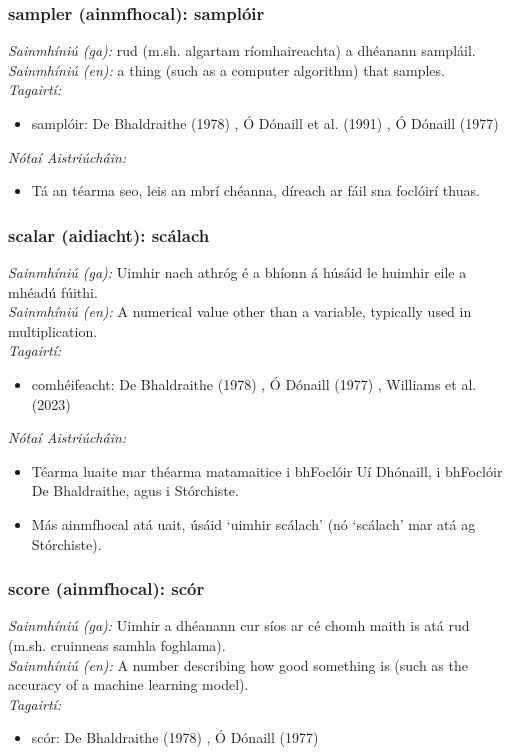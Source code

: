 \subsubsection*{sampler (ainmfhocal): samplóir}
 \noindent \textit{Sainmhíniú (ga):} rud (m.sh. algartam ríomhaireachta) a dhéanann sampláil.
\\
 \noindent \textit{Sainmhíniú (en):} a thing (such as a computer algorithm) that samples.
\\
 \noindent \textit{Tagairtí:}
\begin{itemize}
	\item samplóir: De Bhaldraithe (1978) \cite{de-bhaldraithe}, Ó Dónaill et al. (1991) \cite{focloir-beag}, Ó Dónaill (1977) \cite{odonaill}
\end{itemize}

 \noindent \textit{Nótaí Aistriúcháin:}
\begin{itemize}
	\item Tá an téarma seo, leis an mbrí chéanna, díreach ar fáil sna foclóirí thuas.
\end{itemize}


\subsubsection*{scalar (aidiacht): scálach}
 \noindent \textit{Sainmhíniú (ga):} Uimhir nach athróg é a bhíonn á húsáid le huimhir eile a mhéadú fúithi.
\\
 \noindent \textit{Sainmhíniú (en):} A numerical value other than a variable, typically used in multiplication.
\\
 \noindent \textit{Tagairtí:}
\begin{itemize}
	\item comhéifeacht: De Bhaldraithe (1978) \cite{de-bhaldraithe}, Ó Dónaill (1977) \cite{odonaill}, Williams et al. (2023) \cite{storchiste}
\end{itemize}

 \noindent \textit{Nótaí Aistriúcháin:}
\begin{itemize}
	\item Téarma luaite mar théarma matamaitice i bhFoclóir Uí Dhónaill, i bhFoclóir De Bhaldraithe, agus i Stórchiste.
	\item Más ainmfhocal atá uait, úsáid `uimhir scálach' (nó `scálach' mar atá ag Stórchiste).
\end{itemize}


\subsubsection*{score (ainmfhocal): scór}
 \noindent \textit{Sainmhíniú (ga):} Uimhir a dhéanann cur síos ar cé chomh maith is atá rud (m.sh. cruinneas samhla foghlama).
\\
 \noindent \textit{Sainmhíniú (en):} A number describing how good something is (such as the accuracy of a machine learning model).
\\
 \noindent \textit{Tagairtí:}
\begin{itemize}
	\item scór: De Bhaldraithe (1978) \cite{de-bhaldraithe}, Ó Dónaill (1977) \cite{odonaill}
\end{itemize}

